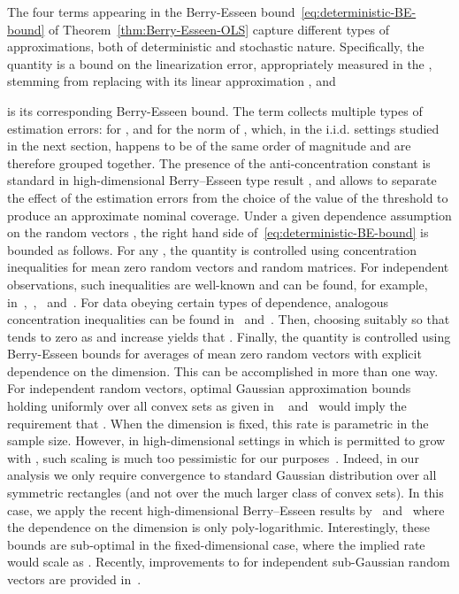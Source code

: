 \documentclass{article}
\begin{document}
The four terms appearing in the Berry-Esseen bound~\eqref{eq:deterministic-BE-bound} of Theorem~\ref{thm:Berry-Esseen-OLS} capture different types of approximations, both of deterministic and stochastic nature. Specifically, the quantity
  is a bound on the linearization
error, appropriately measured in the  , stemming from replacing   with its
linear approximation  , and
 
is its corresponding Berry-Esseen bound. The term   collects multiple types of estimation errors: for  ,   and for the norm of  , which, in the i.i.d. settings studied in the next section, happens to be of the same order of magnitude and are therefore grouped together. The presence of the anti-concentration constant   is standard in high-dimensional Berry--Esseen type result \citep{chernozhukov2017detailed}, and allows to separate the effect of the estimation errors from the choice of the value of the threshold   to produce an approximate   nominal coverage.
Under a given dependence assumption on the random vectors  , the right hand side of~\eqref{eq:deterministic-BE-bound} is bounded as follows. For any  , the quantity   is controlled using concentration inequalities for mean zero random vectors and random matrices. For independent observations, such
inequalities are well-known and can be found, for example, in~\cite{LED91},~\cite{einmahl2008characterization},~\cite{Ver12,Vershynin18} and~\cite{tropp2016expected}. For data obeying certain types of dependence, analogous concentration inequalities can be found in~\cite{Liu13} and~\citet{Uniform:Kuch18}. Then, choosing   suitably so that   tends to zero as   and   increase yields that  . Finally, the quantity   is controlled using Berry-Esseen bounds for averages of mean zero random vectors with explicit dependence on the dimension. This can be accomplished in more than one way. For independent random vectors, optimal Gaussian approximation bounds holding uniformly over all convex sets as given in ~\cite{bentkus2003dependence} and~\cite{raivc2019multivariate} would imply the requirement that  . When the dimension   is fixed, this rate is parametric in the sample size. However, in high-dimensional settings in which   is permitted to grow with  , such scaling is much too pessimistic for our purposes~\citep{MR1115160}. Indeed, in our analysis we only require convergence to standard Gaussian distribution over all symmetric rectangles (and not over the much larger class of convex sets). In this case, we apply the recent high-dimensional Berry--Esseen results by~\cite{Chern17} and~\cite{koike2019notes} \citep{ZhangWu17} where the dependence on the dimension is only poly-logarithmic. Interestingly, these bounds are sub-optimal in the fixed-dimensional case, where the implied rate would scale as  . Recently, improvements to   for independent sub-Gaussian random vectors are provided in~\cite{chernozhukov2019improved}.
\end{document}
